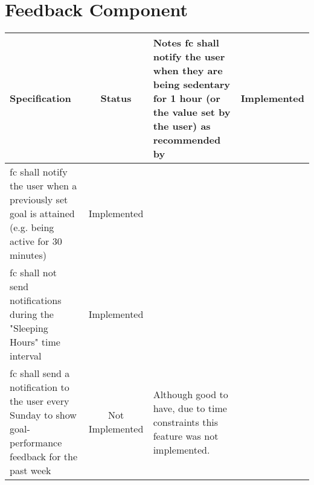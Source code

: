  \section{Feedback Component}
 \tabulinesep=1.5mm
  \begin{longtabu} to \textwidth {|X|c|X|}
    \hline
      \textbf{Specification}
      & \textbf{Status}
      & \textbf{Notes}
    \endhead \hline
    \gls{fc} shall notify the user when they are being sedentary for 1 hour (or the value set by the user) as recommended by \citet[]{swartz2011}
    & Implemented
    & 
    \\ \hline
    \gls{fc} shall notify the user when a previously set goal is attained (e.g. being active for 30 minutes)
    & Implemented
    & 
    \\ \hline
    \gls{fc} shall not send notifications during the "Sleeping Hours" time interval
    & Implemented
    & 
    \\ \hline
    \gls{fc} shall send a notification to the user every Sunday to show goal-performance feedback for the past week
    & Not Implemented
    & Although good to have, due to time constraints this feature was not implemented.
    \\ \hline
 \end{longtabu}
 